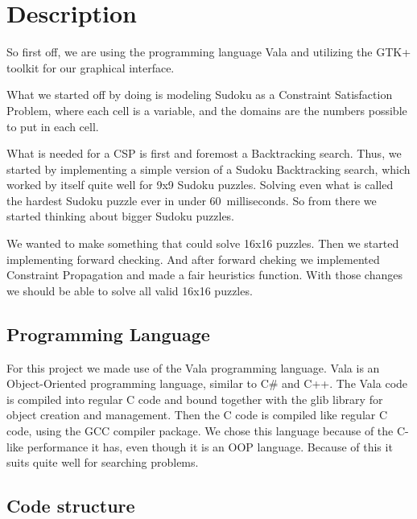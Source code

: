\documentclass[12pt,a4paper]{article}
\begin{document}

\section*{Description}%

So first off, we are using the programming language Vala and utilizing the GTK+ toolkit for our graphical interface. %

What we started off by doing is modeling Sudoku as a Constraint Satisfaction Problem,
where each cell is a variable, and the domains are the numbers possible to put in each
cell.

What is needed for a CSP is first and foremost a Backtracking search. Thus, we started
by implementing a simple version of a Sudoku Backtracking search, which worked by
itself quite well for 9x9 Sudoku puzzles. Solving even what is called the hardest
Sudoku puzzle ever in under 60~milliseconds. So from there we started thinking about bigger Sudoku puzzles.

We wanted to make something that could solve 16x16 puzzles.
Then we started implementing forward checking. And after forward cheking we 
implemented Constraint Propagation and made a fair heuristics function. With those changes we should be able to solve all valid 16x16 puzzles.

\subsection*{Programming Language}

For this project we made use of the Vala programming language. Vala is an
Object-Oriented programming language, similar to C\# and C++. The Vala code is
compiled into regular C code and bound together with the glib library for object
creation and management. Then the C code is compiled like regular C code, using
the GCC compiler package. We chose this language because of the C-like performance
it has, even though it is an OOP language. Because of this it suits quite well
for searching problems.

\subsection*{Code structure}
\end{document}
